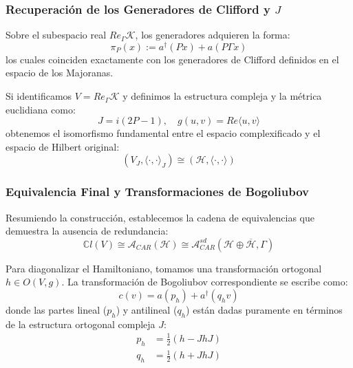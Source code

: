 \begin{frame}
  \frametitle{Recuperación de los Generadores de Clifford y $J$}

  Sobre el subespacio real $Re_\Gamma \mathcal{K}$, los generadores adquieren la forma:
  \begin{equation*}
      \pi_P(x) := a^{\dagger}(Px) + a(P\Gamma x)
  \end{equation*}
  los cuales coinciden exactamente con los generadores de Clifford definidos en el espacio de los Majoranas.

  \vspace{0.3cm}
  Si identificamos $V = Re_\Gamma \mathcal{K}$ y definimos la estructura compleja y la métrica euclidiana como:
  \begin{equation*}
      J = i(2P - 1), \quad g(u,v) = Re\langle u,v \rangle
  \end{equation*}
  obtenemos el isomorfismo fundamental entre el espacio complexificado y el espacio de Hilbert original:
  \begin{equation*}
      (V_J, \langle \cdot, \cdot \rangle_J) \cong (\mathcal{H}, \langle \cdot, \cdot \rangle)
  \end{equation*}
\end{frame}

\begin{frame}
  \frametitle{Equivalencia Final y Transformaciones de Bogoliubov}

  Resumiendo la construcción, establecemos la cadena de equivalencias que demuestra la ausencia de redundancia:
  \begin{equation}
      \mathbb{C}l(V) \cong \mathcal{A}_{CAR}(\mathcal{H}) \cong \mathcal{A}_{CAR}^{sd}(\mathcal{H} \oplus \overline{\mathcal{H}}, \Gamma)
      \label{eq:III.13}
  \end{equation}

  \vspace{0.2cm}
  Para diagonalizar el Hamiltoniano, tomamos una transformación ortogonal $h \in O(V, g)$. La transformación de Bogoliubov correspondiente se escribe como:
  \begin{equation}
      c(v) = a(p_h) + a^{\dagger}(q_h v)
      \label{eq:III.14}
  \end{equation}
  donde las partes lineal ($p_h$) y antilineal ($q_h$) están dadas puramente en términos de la estructura ortogonal compleja $J$:
  \begin{align}
      p_h &= \frac{1}{2}(h - JhJ) \label{eq:III.15} \\
      q_h &= \frac{1}{2}(h + JhJ) \label{eq:III.16}
  \end{align}
\end{frame}
